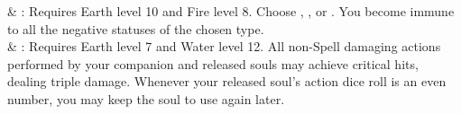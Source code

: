 \begin{tabjob}
      & %
    : Requires Earth level 10 and Fire level 8. Choose , , or . You become immune to all the negative statuses of the chosen type. \\
      & %
    : Requires Earth level 7 and Water level 12. All non-Spell damaging actions performed by your companion and released souls may achieve critical hits, dealing triple damage. Whenever your released soul's action dice roll is an even number, you may keep the soul to use again later. \\
\end{tabjob}
